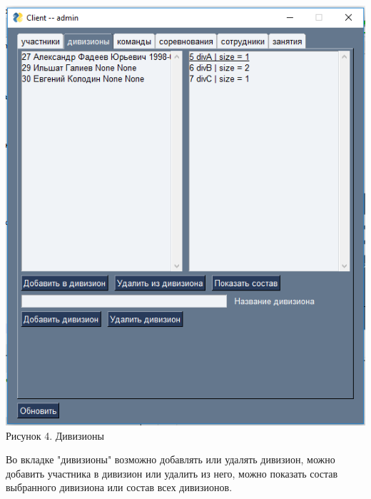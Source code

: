 \documentclass[a4paper,12pt,preview]{report} %
\begin{document}
	
	\begin{center}
		\includegraphics{divisions.PNG} \\
		Рисунок 4. Дивизионы
	\end{center}
	
	Во вкладке "дивизионы" возможно добавлять или удалять дивизион, можно добавить участника в дивизион или удалить из него, можно показать состав выбранного дивизиона или состав всех дивизионов.
	
\end{document}
